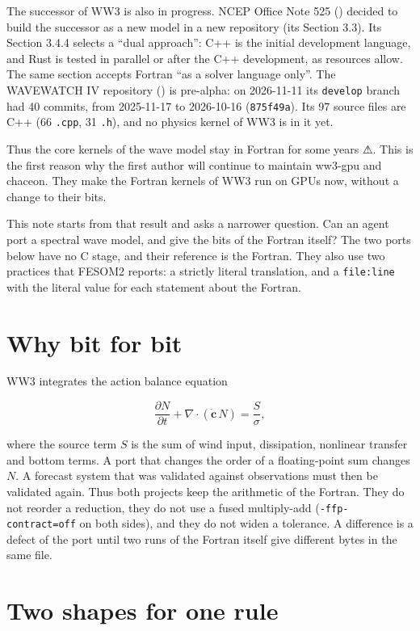 \documentclass[10pt,a4paper,]{article}
\begin{document}
The successor of WW3 is also in progress. NCEP Office Note 525
() decided to build the successor as a
new model in a new repository (its Section 3.3). Its Section 3.4.4
selects a ``dual approach'': C++ is the initial development language,
and Rust is tested in parallel or after the C++ development, as
resources allow. The same section accepts Fortran ``as a solver language
only''. The WAVEWATCH IV repository () is pre-alpha: on 2026-11-11 its
\texttt{develop} branch had 40 commits, from 2025-11-17 to 2026-10-16
(\texttt{875f49a}). Its 97 source files are C++ (66 \texttt{.cpp}, 31
\texttt{.h}), and no physics kernel of WW3 is in it yet.

Thus the core kernels of the wave model stay in Fortran for some years
⚠. This is the first reason why the first author will continue to
maintain ww3-gpu and chaceon. They make the Fortran kernels of WW3 run
on GPUs now, without a change to their bits.

This note starts from that result and asks a narrower question. Can an
agent port a spectral wave model, and give the bits of the Fortran
itself? The two ports below have no C stage, and their reference is the
Fortran. They also use two practices that FESOM2 reports: a strictly
literal translation, and a \texttt{file:line} with the literal value for
each statement about the Fortran.

\section{Why bit for bit}\label{sec:why}

WW3 integrates the action balance equation

\[\frac{\partial N}{\partial t} + \nabla\cdot(\dot{\mathbf{c}}\,N) = \frac{S}{\sigma},\]

where the source term \(S\) is the sum of wind input, dissipation,
nonlinear transfer and bottom terms. A port that changes the order of a
floating-point sum changes \(N\). A forecast system that was validated
against observations must then be validated again. Thus both projects
keep the arithmetic of the Fortran. They do not reorder a reduction,
they do not use a fused multiply-add (\texttt{-ffp-contract=off} on both
sides), and they do not widen a tolerance. A difference is a defect of
the port until two runs of the Fortran itself give different bytes in
the same file.

\section{Two shapes for one rule}\label{sec:shapes}
\end{document}
